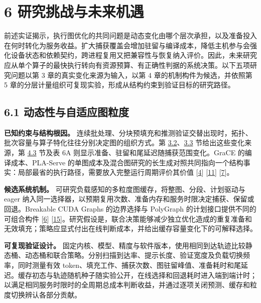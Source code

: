 \documentclass[UTF8,10.5pt,fontset=windows]{ctexart}
\begin{document}
\hypertarget{section-6}{%
\section{6 研究挑战与未来机遇}\label{section-6}}

前述实证揭示，执行图优化的共同问题是动态变化由哪个层次承担，以及准备投入在何时转化为服务收益。扩大捕获覆盖会增加驻留与编译成本，降低主机参与会强化设备状态和依赖契约，跨进程复用又把兼容性与恢复纳入评价。因此，未来研究应从单个算子的最快执行转向有资源预算、有正确性判据的系统决策。以下五项研究问题以第
3 章的真实变化来源为输入，以第 4 章的机制构件为候选，并依照第 5
章的分层计量组织可复现实验，形成从结构约束到验证目标的研究路径。

\hypertarget{section-6-1}{%
\subsection{6.1 动态性与自适应图粒度}\label{section-6-1}}

\textbf{已知约束与结构根因。}
连续批处理、分块预填充和推测验证交替出现时，拓扑、批次容量与算子特化往往分别决定图的组织方式。第
\protect\hyperlink{section-3-2}{3.2}、\protect\hyperlink{section-3-3}{3.3}
节给出这些变化来源，第 \protect\hyperlink{section-4-3}{4.3} 节及表 6A
则显示准备、驻留和尾延迟随捕获范围变化。GraCE 的编译成本、PLA-Serve
的单图成本及混合图研究的长生成对照共同指向一个结构事实：局部最省的执行路径，需要放入完整运行周期评价其价值
{[}\protect\hyperlink{ref-ghosh2026grace}{4}{]}
{[}\protect\hyperlink{ref-she2026plaserve}{11}{]}
{[}\protect\hyperlink{ref-yadav2026hybridpreprint}{7}{]}。

\textbf{候选系统机制。}
可研究负载感知的多粒度图缓存，将整图、分段、计划驱动与 eager
纳入同一选择器，以预期复用次数、准备内存和服务时限决定捕获、保留或回退。Breakable
CUDA Graphs 的边界选择与 PolyGraph 的计划接口提供不同的可组合构件
{[}\protect\hyperlink{ref-lmsys2026breakable}{6}{]}
{[}\protect\hyperlink{ref-yang2026polygraph}{15}{]}。研究假设是，联合决策能够减少独立优化造成的重复准备和无效填充；策略应显式付出在线判断成本，并给出缓存容量变化下的可解释选择。

\textbf{可复现验证设计。}
固定内核、模型、精度与软件版本，使用相同到达轨迹比较静态桶、动态桶和联合策略。分别扫描到达率、提示长度、验证宽度及负载切换频率，同时测量有效
token、填充工作、捕获次数、图驻留峰值、准备耗时和尾延迟。缓存初态与轨迹随机种子随实验公开，在线选择和回退耗时进入端到端计时；以满足相同服务时限时的全周期总成本判断收益，并通过逐项关闭预测、缓存和粒度切换辨认各部分贡献。
\end{document}
